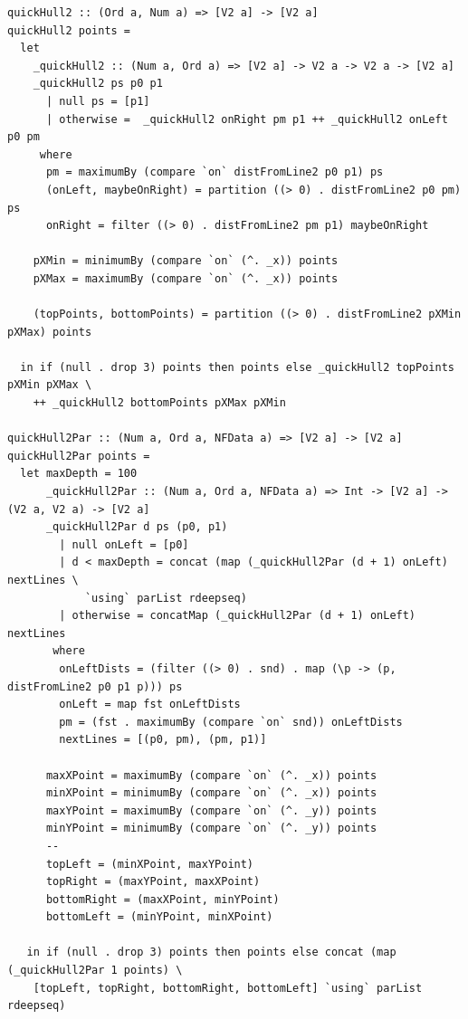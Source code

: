 \documentclass[12pt]{article}
\begin{document}
    \begin{verbatim}
quickHull2 :: (Ord a, Num a) => [V2 a] -> [V2 a]
quickHull2 points =
  let
    _quickHull2 :: (Num a, Ord a) => [V2 a] -> V2 a -> V2 a -> [V2 a]
    _quickHull2 ps p0 p1
      | null ps = [p1]
      | otherwise =  _quickHull2 onRight pm p1 ++ _quickHull2 onLeft p0 pm
     where
      pm = maximumBy (compare `on` distFromLine2 p0 p1) ps
      (onLeft, maybeOnRight) = partition ((> 0) . distFromLine2 p0 pm) ps
      onRight = filter ((> 0) . distFromLine2 pm p1) maybeOnRight

    pXMin = minimumBy (compare `on` (^. _x)) points
    pXMax = maximumBy (compare `on` (^. _x)) points

    (topPoints, bottomPoints) = partition ((> 0) . distFromLine2 pXMin pXMax) points

  in if (null . drop 3) points then points else _quickHull2 topPoints pXMin pXMax \
    ++ _quickHull2 bottomPoints pXMax pXMin

quickHull2Par :: (Num a, Ord a, NFData a) => [V2 a] -> [V2 a]
quickHull2Par points =
  let maxDepth = 100
      _quickHull2Par :: (Num a, Ord a, NFData a) => Int -> [V2 a] -> (V2 a, V2 a) -> [V2 a]
      _quickHull2Par d ps (p0, p1)
        | null onLeft = [p0]
        | d < maxDepth = concat (map (_quickHull2Par (d + 1) onLeft) nextLines \
            `using` parList rdeepseq)
        | otherwise = concatMap (_quickHull2Par (d + 1) onLeft) nextLines
       where
        onLeftDists = (filter ((> 0) . snd) . map (\p -> (p, distFromLine2 p0 p1 p))) ps
        onLeft = map fst onLeftDists
        pm = (fst . maximumBy (compare `on` snd)) onLeftDists
        nextLines = [(p0, pm), (pm, p1)]

      maxXPoint = maximumBy (compare `on` (^. _x)) points
      minXPoint = minimumBy (compare `on` (^. _x)) points
      maxYPoint = maximumBy (compare `on` (^. _y)) points
      minYPoint = minimumBy (compare `on` (^. _y)) points
      --
      topLeft = (minXPoint, maxYPoint)
      topRight = (maxYPoint, maxXPoint)
      bottomRight = (maxXPoint, minYPoint)
      bottomLeft = (minYPoint, minXPoint)

   in if (null . drop 3) points then points else concat (map (_quickHull2Par 1 points) \
    [topLeft, topRight, bottomRight, bottomLeft] `using` parList rdeepseq)
    \end{verbatim}
\end{document}
